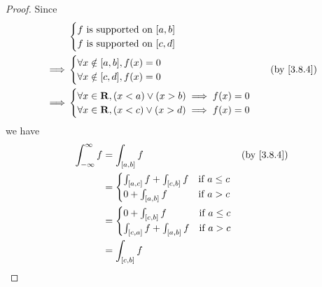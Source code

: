 \begin{proof}
  Since
  \begin{align*}
             & \begin{cases}
                 f \text{ is supported on } [a, b] \\
                 f \text{ is supported on } [c, d]
               \end{cases}                             \\
    \implies & \begin{cases}
                 \forall x \notin [a, b], f(x) = 0 \\
                 \forall x \notin [c, d], f(x) = 0
               \end{cases}                        & \text{(by \cref{3.8.4})} \\
    \implies & \begin{cases}
                 \forall x \in \R, (x < a) \lor (x > b) \implies f(x) = 0 \\
                 \forall x \in \R, (x < c) \lor (x > d) \implies f(x) = 0
               \end{cases}
  \end{align*}
  we have
  \begin{align*}
    \int_{-\infty}^\infty f & = \int_{[a, b]} f                                                                                                            & \text{(by \cref{3.8.4})} \\
                            & = \begin{cases}
                                  \int_{[a, c]} f + \int_{[c, b]} f & \text{if } a \leq c \\
                                  0 + \int_{[a, b]} f               & \text{if } a > c
                                \end{cases}                             \\
                            & = \begin{cases}
                                  0 + \int_{[c, b]} f               & \text{if } a \leq c \\
                                  \int_{[c, a]} f + \int_{[a, b]} f & \text{if } a > c
                                \end{cases}                             \\
                            & = \int_{[c, b]} f                                                                                                                                       \\

\end{align*}
\end{proof}
